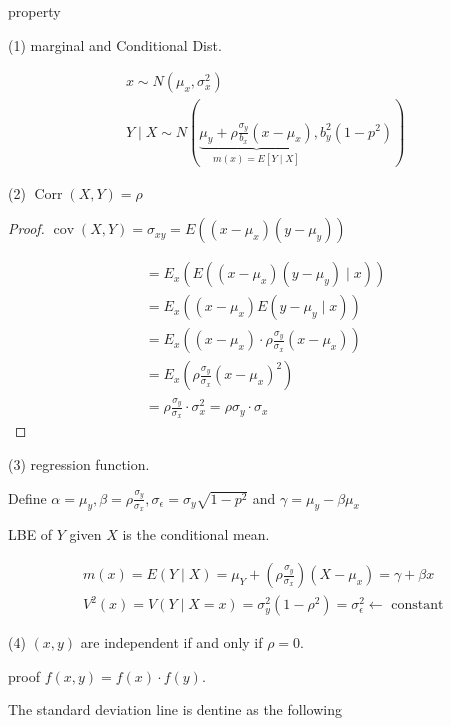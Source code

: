 \documentclass[10pt]{article}
\begin{document}
property 

(1) marginal and Conditional Dist.

$$
\begin{aligned}
& x \sim N\left(\mu_{x}, \sigma_{x}^{2}\right) \\
& Y \mid X \sim N(\underbrace{\mu_{y}+\rho \frac{\sigma_{y}}{b_{x}}\left(x-\mu_{x}\right)}_{m(x)=E[Y \mid X]}, b_{y}^{2}\left(1-p^{2}\right))
\end{aligned}
$$



(2) $\operatorname{Corr}(X, Y)=\rho$

\begin{proof}
    $\operatorname{cov}(X, Y)=\sigma_{x y}=E\left(\left(x-\mu_{x}\right)\left(y-\mu_{y}\right)\right)$

$$
\begin{aligned}
& =E_{x}\left(E\left(\left(x-\mu_{x}\right)\left(y-\mu_{y}\right) \mid x\right)\right) \\
& =E_{x}\left(\left(x-\mu_{x}\right) E\left(y-\mu_{y} \mid x\right)\right) \\
& =E_{x}\left(\left(x-\mu_{x}\right) \cdot \rho \frac{\sigma_{y}}{\sigma_{x}}\left(x-\mu_{x}\right)\right) \\
& =E_{x}\left(\rho \frac{\sigma_{y}}{\sigma_{x}}\left(x-\mu_{x}\right)^{2}\right) \\
& =\rho \frac{\sigma_{y}}{\sigma_{x}} \cdot \sigma_{x}^{2}=\rho \sigma_{y} \cdot \sigma_{x}
\end{aligned}
$$

\end{proof}


(3) regression function.

Define $\alpha=\mu_{y}, \beta=\rho \frac{\sigma_{y}}{\sigma_{x}}, {\sigma}_{\epsilon}=\sigma_{y} \sqrt{1-p^{2}}$ and $\gamma=\mu_{y}-\beta \mu_{x}$

LBE of $Y$ given $X$ is the conditional mean.

$$
\begin{aligned}
& m(x)=E(Y \mid X)=\mu_{Y}+\left(\rho \frac{\sigma_{y}}{\sigma_{x}}\right)\left(X-\mu_{x}\right)=\gamma+\beta x \\
& V^{2}(x)=V(Y \mid X=x)=\sigma_{y}^{2}\left(1-\rho^{2}\right)=\sigma_{\epsilon}^{2} \leftarrow \text { constant }
\end{aligned}
$$

(4) $(x, y)$ are independent if and only if $\rho=0$.

proof $f(x, y)=f(x) \cdot f(y)$.
\begin{definition}
    The standard deviation line is dentine as the following
\end{definition}
\end{document}
